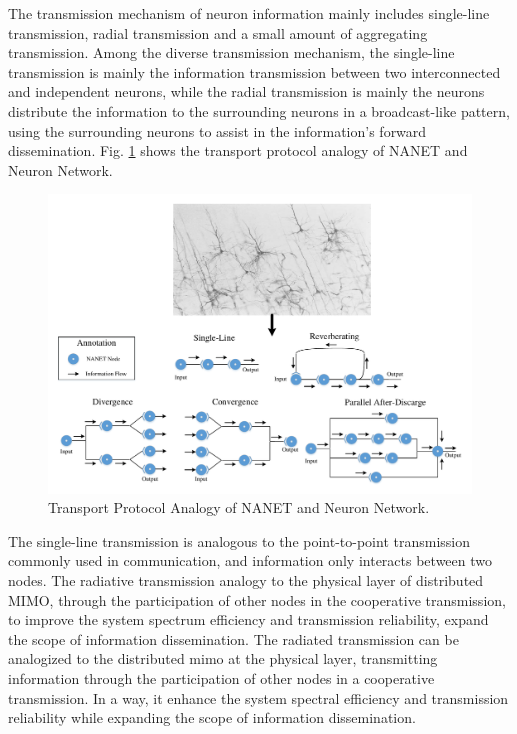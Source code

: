 \documentclass[journal,comsoc]{IEEEtran}
\begin{document}
				The transmission mechanism of neuron information mainly includes single-line transmission, radial transmission and a small amount of aggregating transmission.
				Among the diverse transmission mechanism, the single-line transmission is mainly the information transmission between two interconnected and independent neurons, while the radial transmission is mainly the neurons distribute the information to the surrounding neurons in a broadcast-like pattern, using the surrounding neurons to assist in the information's forward dissemination.
				Fig. \ref{fig: transport_pro} shows the transport protocol analogy of NANET and Neuron Network.
				\begin{figure}[htbp]
					\centering
					\includegraphics[width=0.9\linewidth]{figures/tran_protocol.pdf}
					\caption{Transport Protocol Analogy of NANET and Neuron Network.}	
					\label{fig: transport_pro}
				\end{figure}
			
				The single-line transmission is analogous to the point-to-point transmission commonly used in communication, and information only interacts between two nodes.
				The radiative transmission analogy to the physical layer of distributed MIMO, through the participation of other nodes in the cooperative transmission, to improve the system spectrum efficiency and transmission reliability, expand the scope of information dissemination.
				The radiated transmission can be analogized to the distributed mimo at the physical layer, transmitting information through the participation of other nodes in a cooperative transmission.
				In a way, it enhance the system spectral efficiency and transmission reliability while expanding the scope of information dissemination.
			
\end{document}
